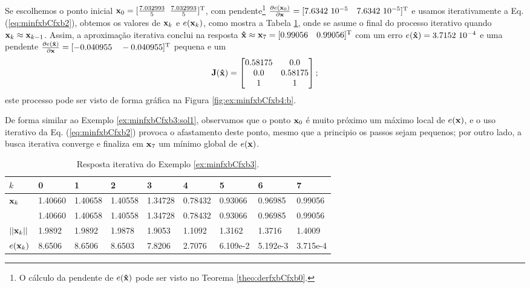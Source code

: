 \begin{SolutionT}
\label{ex:minfxbCfxb3:sol2}
Se escolhemos o ponto inicial $\VECTOR{x}_0=[\frac{7.032993}{5}$ $\frac{7.032993}{5}]^{\mathrm{T}}$,
com pendente\footnote{O cálculo da
pendente de $e(\VECTOR{\hat{x}})$ pode ser visto no Teorema \ref{theo:derfxbCfxb0}.} 
$\frac{\partial e(\VECTOR{x}_0)}{\partial \VECTOR{x} }=[7.6342~10^{-5}\quad 7.6342~10^{-5}]^{\transpose}$ e 
usamos iterativamente a Eq. (\ref{eq:minfxbCfxb2}), obtemos os valores 
de $\VECTOR{x}_k$ e $e(\VECTOR{x}_k)$, como mostra a Tabela \ref{table:ex:minfxbCfxb4},
onde se asume o final do processo iterativo quando $\VECTOR{x}_k \approx \VECTOR{x}_{k-1}$.
Assim, a aproximação iterativa conclui na resposta $\VECTOR{\hat{x}}\approx \VECTOR{x}_{7} =[0.99056\quad 0.99056]^{\transpose}$
com um erro $e(\VECTOR{\hat{x}})=3.7152~10^{-4}$ e uma pendente
$\frac{\partial e(\VECTOR{\hat{x}})}{\partial \VECTOR{x} }=[-0.040955\quad -0.040955]^{\transpose}$
pequena e um
\begin{equation}
\MATRIX{J}(\VECTOR{\hat{x}})=
\begin{bmatrix}
0.58175 & 0.0\\ 
0.0     & 0.58175\\
1       & 1
\end{bmatrix};
\end{equation}
este processo pode ser visto de forma gráfica na Figura \ref{fig:ex:minfxbCfxb4:b}.

De forma similar ao Exemplo \ref{ex:minfxbCfxb3:sol1}, observamos 
que o ponto $\VECTOR{x}_0$ é muito próximo um máximo local de 
$e(\VECTOR{x})$, e o uso iterativo da Eq. (\ref{eq:minfxbCfxb2}) 
provoca o afastamento deste ponto, mesmo que a principio os passos sejam pequenos;
por outro lado, a busca iterativa converge e finaliza em $\VECTOR{x}_7$ um mínimo global
de $e(\VECTOR{x})$.
\end{SolutionT}


\begin{table}[h!]
\centering
\begin{tabular}{|l|l|l|l|l|l|l|l|l|}
\hline
$k$ & 0 & 1 & 2 & 3 & 4 & 5 & 6 & 7\\ \hline
$\VECTOR{x}_k$ & 1.40660   & 1.40658   & 1.40558   & 1.34728   & 0.78432   & 0.93066   & 0.96985   & 0.99056 \\ 
~              & 1.40660   & 1.40658   & 1.40558   & 1.34728   & 0.78432   & 0.93066   & 0.96985   & 0.99056 \\ \hline
$||\VECTOR{x}_k||$ & 1.9892   & 1.9892   & 1.9878   & 1.9053   & 1.1092   & 1.3162   & 1.3716   & 1.4009 \\ \hline
$e(\VECTOR{x}_k)$ & 8.6506  & 8.6506  & 8.6503  & 7.8206  & 2.7076  & 6.109e-2 &  5.192e-3  & 3.715e-4 \\ \hline
\end{tabular}
\caption{Resposta iterativa do Exemplo \ref{ex:minfxbCfxb3}.}
\label{table:ex:minfxbCfxb4}
\end{table}

